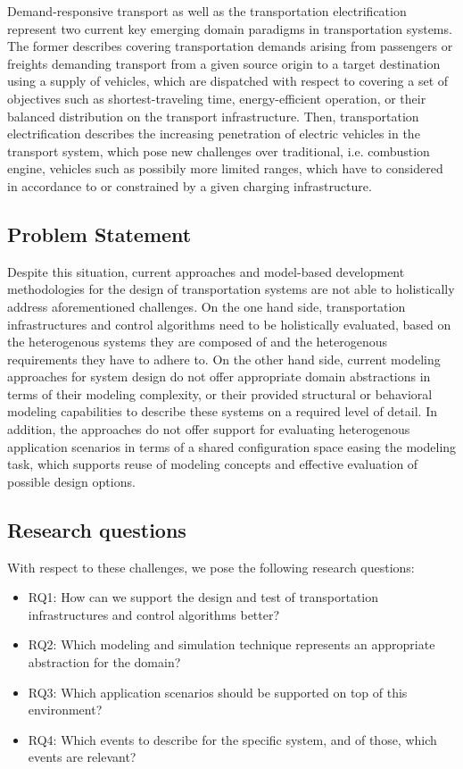 \documentclass[graybox]{svmult}
\begin{document}
Demand-responsive transport \cite{brake_demand_2004} as well as the transportation electrification \cite{pereirinha2018main} represent two current key emerging domain paradigms in transportation systems. The former describes covering transportation demands arising from passengers or freights demanding transport from a given source origin to a target destination using a supply of vehicles, which are dispatched with respect to covering a set of objectives such as shortest-traveling time, energy-efficient operation, or their balanced distribution on the transport infrastructure. Then, transportation electrification describes the increasing penetration of electric vehicles in the transport system, which pose new challenges over traditional, i.e. combustion engine, vehicles such as possibily more limited ranges, which have to considered in accordance to or constrained by a given charging infrastructure. 

\subsection{Problem Statement}

Despite this situation, current approaches and model-based development methodologies for the design of transportation systems are not able to holistically address aforementioned challenges. On the one hand side, transportation infrastructures and control algorithms need to be holistically evaluated, based on the heterogenous systems they are composed of and the heterogenous requirements they have to adhere to. On the other hand side, current modeling approaches for system design do not offer appropriate domain abstractions in terms of their modeling complexity, or their provided structural or behavioral modeling capabilities to describe these systems on a required level of detail. In addition, the approaches do not offer support for evaluating heterogenous application scenarios in terms of a shared configuration space easing the modeling task, which supports reuse of modeling concepts and effective evaluation of possible design options. 

\subsection{Research questions}
With respect to these challenges, we pose the following research questions:
\begin{itemize}
	\item RQ1: How can we support the design and test of transportation infrastructures and control algorithms better?
	\item RQ2: Which modeling and simulation technique represents an appropriate abstraction for the domain?
	\item RQ3: Which application scenarios should be supported on top of this environment?
	\item RQ4: Which events to describe for the specific system, and of those, which events are relevant?
\end{itemize}
\end{document}
